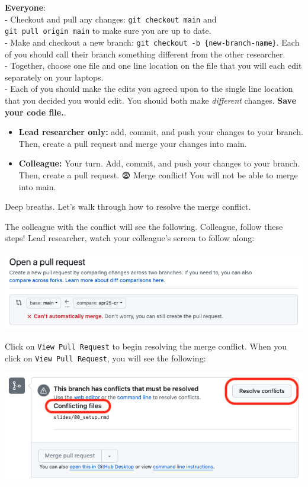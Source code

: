 \documentclass[
]{book}
\providecommand{\tightlist}{%
  \setlength{\itemsep}{0pt}\setlength{\parskip}{0pt}}
\begin{document}
\textbf{Everyone}:\\
- Checkout and pull any changes: \texttt{git\ checkout\ main} and \texttt{git\ pull\ origin\ main} to make sure you are up to date.\\
- Make and checkout a new branch: \texttt{git\ checkout\ -b\ \{new-branch-name\}}. Each of
you should call their branch something different from the other researcher.\\
- Together, choose one file and one line location on the file that you will each
edit separately on your laptops.\\
- Each of you should make the edits you agreed upon to the single line location that you decided you would edit. You should both make \emph{different} changes. \textbf{Save your code file.}.

\begin{itemize}
\tightlist
\item
  \textbf{Lead researcher only:} add, commit, and push your changes to your branch.
  Then, create a pull request and merge your changes into main.
\end{itemize}

\begin{itemize}
\tightlist
\item
  \textbf{Colleague:} Your turn. Add, commit, and push your changes to your branch.
  Then, create a pull request. 😨 Merge conflict! You will not
  be able to merge into main.
\end{itemize}

Deep breaths. Let's walk through how to resolve the merge conflict.

The colleague with the conflict will see the following. Colleague, follow these steps!
Lead researcher, watch your colleague's screen to follow along:

\includegraphics[width=1\linewidth]{./figures/merge-conflict-1}

Click on \texttt{View\ Pull\ Request} to begin resolving the merge conflict. When you click on \texttt{View\ Pull\ Request}, you will see the following:

\includegraphics[width=1\linewidth]{./figures/merge-conflict-2}
\end{document}
